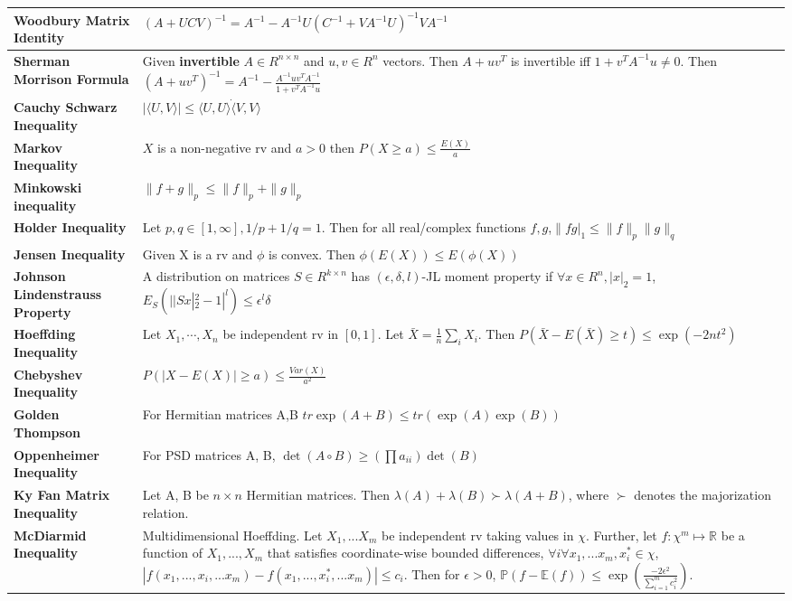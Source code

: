 \documentclass[11pt]{article}
\begin{document}
\begin{tabular}{|>{\raggedright}m{4.5cm}|m{13cm}|} \hline
\textbf{Woodbury Matrix Identity} & $(A+UCV)^{-1} = A^{-1} - A^{-1}U(C^{-1}+VA^{-1}U)^{-1}VA^{-1}$\\ \hline
\textbf{Sherman Morrison Formula} & Given \textbf{invertible} $A \in R^{n\times n}$ and $u,v\in R^n$ vectors. Then $A+uv^T$ is invertible iff $1+v^TA^{-1}u \neq 0$. Then $(A+uv^T)^{-1} = A^{-1}-\frac{A^{-1}uv^TA^{-1}}{1+v^TA^{-1}u}$\\ \hline
\textbf{Cauchy Schwarz Inequality} & $ |\langle U, V \rangle| \leq \langle U, U\rangle \dot \langle V, V\rangle $\\ \hline
\textbf{Markov Inequality} & $X$ is a non-negative rv and $a>0$ then $P(X \geq a) \leq \frac{E(X)}{a}$\\ \hline
\textbf{Minkowski inequality} & $\|f+g\|_p \leq \|f\|_p + \| g\|_p$\\ \hline
\textbf{Holder Inequality} & Let $p,q\in [1, \infty], 1/p+1/q=1$. Then for all real/complex functions $f,g$,$\|fg|_1 \leq \|f\|_p\|g\|_q$\\ \hline
\textbf{Jensen Inequality} & Given X is a rv and $\phi$ is convex. Then $\phi(E(X)) \leq E(\phi(X))$\\ \hline
\textbf{Johnson Lindenstrauss Property} & A distribution on matrices $S\in R^{k \times n}$ has $(\epsilon, \delta, l)$-JL moment property if $\forall x\in R^n, |x|_2=1$, $E_S(||Sx|^2_2-1|^l)\leq \epsilon^l\delta$\\ \hline
\textbf{Hoeffding Inequality} & Let $X_1,\cdots,X_n$ be independent rv in $[0,1]$. Let $\bar{X} = \frac{1}{n}\sum_i{X_i}$. Then $P(\bar{X}-E(\bar{X})\geq t) \leq \exp(-2nt^2)$ \\ \hline
\textbf{Chebyshev Inequality} & $P(|X-E(X)| \geq a) \leq \frac{Var(X)}{a^2}$\\ \hline
\textbf{Golden Thompson} & For Hermitian matrices A,B $tr \exp(A+B) \leq tr(\exp(A)\exp(B))$\\ \hline
\textbf{Oppenheimer Inequality} & For PSD matrices A, B, $\det(A \circ B) \ge \left( \prod a_{ii} \right) \det(B)$\\ \hline
\textbf{Ky Fan Matrix Inequality} & Let A, B be $n \times n$ Hermitian matrices. Then $\lambda(A) + \lambda(B) \succ \lambda(A+B)$, where $\succ$ denotes the majorization relation.\\ \hline
\textbf{McDiarmid Inequality} & Multidimensional Hoeffding. Let $X_1,...X_m$ be independent rv taking values in $\chi$. Further, let $f: \chi^m \mapsto \mathbb{R}$ be a function of $X_1,...,X_m$ that satisfies coordinate-wise bounded differences, $\forall i \forall x_1,...x_m,x_i^* \in \chi$, $\left| f(x_1, ... , x_i, ... x_m) - f(x_1,...,x_i^*, ...x_m) \right| \leq c_i$. Then for $\epsilon>0$, $\mathbb{P}(f - \mathbb{E}(f)) \leq \exp\left(  \frac{-2\epsilon^2}{\sum_{i=1}^{m}c_i^2} \right)$.\\ \hline

\end{tabular}
\end{document}

